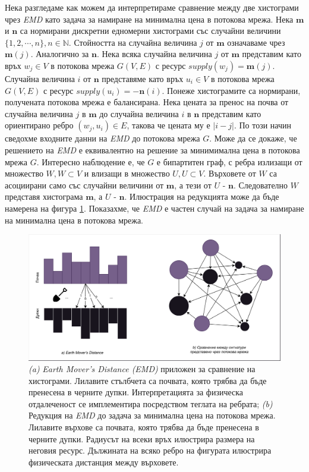 \documentclass[a4paper,12pt]{article}
\begin{document}
\bigbreak

Нека разгледаме как можем да интерпретираме сравнение между две хистограми чрез \textit{EMD} като задача за намиране на минимална цена в потокова мрежа. Нека $\mathbf{m}$ и $\mathbf{n}$ са нормирани дискретни едномерни хистограми със случайни величини $\{1, 2, \cdots, n\}, n \in \mathbb{N}$. Стойността на случайна величина $j$ от $\mathbf{m}$ означаваме чрез $\mathbf{m}(j)$. Аналогично за $\mathbf{n}$. Нека всяка случайна величина $j$ от $\mathbf{m}$ представим като връх $w_j \in V$ в потокова мрежа $G(V, E)$ с ресурс $supply(w_j) = \mathbf{m}(j)$. Случайна величина $i$ от $\mathbf{n}$ представяме като връх $u_i \in V$ в потокова мрежа $G(V, E)$ с ресурс $supply(u_i) = -\mathbf{n}(i)$. Понеже хистограмите са нормирани, получената потокова мрежа е балансирана. Нека цената за пренос на почва от случайна величина $j$ в $\mathbf{m}$ до случайна величина $i$ в $\mathbf{n}$ представим като ориентирано ребро $(w_j, u_i) \in E$, такова че цената му е $|i - j|$. По този начин сведохме входните данни на \textit{EMD} до потокова мрежа $G$. Може да се докаже, че решението на \textit{EMD} е еквивалентно на решение за минимимална цена в потокова мрежа $G$. Интересно наблюдение е, че $G$ е бипартитен граф, с ребра излизащи от множество $W, W \subset V$ и влизащи в множество $U, U \subset V$. Върховете от $W$ са асоциирани само със случайни величини от $\mathbf{m}$, а тези от $U$ - $\mathbf{n}$. Следователно $W$ представя хистограма $\mathbf{m}$, а $U$ - $\mathbf{n}$. Илюстрация на редукцията може да бъде намерена на фигура \ref{fig:emdandreduction}. Показахме, че \textit{EMD} е частен случай на задача за намиране на минимална цена в потокова мрежа.

\begin{figure}[ht]
    \centering
    \includegraphics[width=\textwidth]{emd_and_reduction.png}
    \caption{\textit{(a)} \textit{Earth Mover's Distance (EMD)} приложен за сравнение на хистограми. Лилавите стълбчета са почвата, която трябва да бъде пренесена в черните дупки. Интерпретацията за физическа отдалеченост се имплементира посредством теглата на ребрата; \textit{(b)} Редукция на \textit{EMD} до задача за минимална цена на потокова мрежа. Лилавите върхове са почвата, която трябва да бъде пренесена в черните дупки. Радиусът на всеки връх илюстрира размера на неговия ресурс. Дължината на всяко ребро на фигурата илюстрира физическата дистанция между върховете.}
    \label{fig:emdandreduction}
\end{figure}
\end{document}
